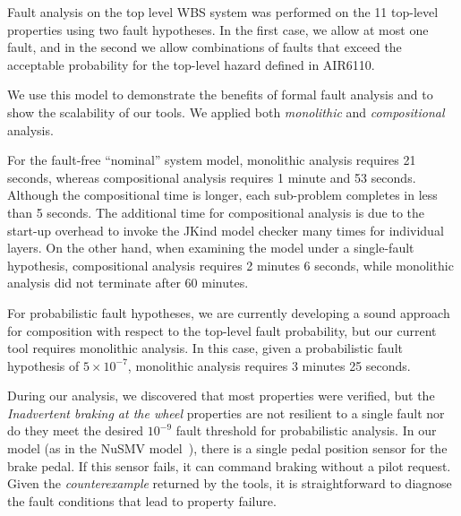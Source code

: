Fault analysis on the top level WBS system was performed on the 11 top-level properties using two fault hypotheses.  In the first case, we allow at most one fault, and in the second we allow combinations of faults that exceed the acceptable probability for the top-level hazard defined in AIR6110.

We use this model to demonstrate the benefits of formal fault analysis and to show the scalability of our tools.  We applied both {\em monolithic} and {\em compositional} analysis.


For the fault-free ``nominal'' system model, monolithic analysis requires 21 seconds, whereas compositional analysis requires 1 minute and 53 seconds.  Although the compositional time is longer, each sub-problem completes in less than 5 seconds.  The additional time for compositional analysis is  due to the start-up overhead to invoke the JKind model checker many times for individual layers.  On the other hand, when examining the model under a single-fault hypothesis, compositional analysis requires 2 minutes 6 seconds, while monolithic analysis did not terminate after 60 minutes.

For probabilistic fault hypotheses, we are currently developing a sound approach for composition with respect to the top-level fault probability, but our current tool requires monolithic analysis.  In this case, given a probabilistic fault hypothesis of $5\times 10^{-7}$, monolithic analysis requires 3 minutes 25 seconds.

During our analysis, we discovered that most properties were verified, but the \textit{Inadvertent braking at the wheel} properties are not resilient to a single fault nor do they meet the desired $10^{-9}$ fault threshold for probabilistic analysis.  In our model (as in the NuSMV model~\cite{DBLP:conf/cav/BozzanoCPJKPRT15}), there is a single pedal position sensor for the brake pedal.  If this sensor fails, it can command braking without a pilot request.  Given the {\em counterexample} returned by the tools, it is straightforward to diagnose the fault conditions that lead to property failure.


